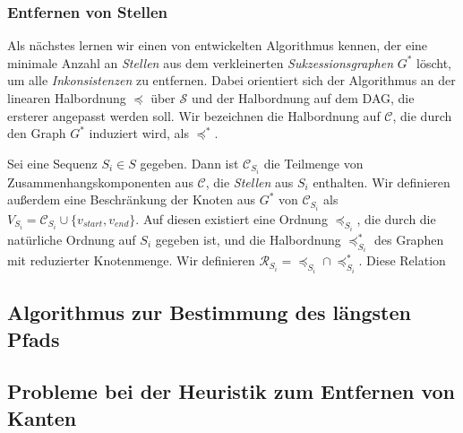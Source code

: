 \begin{center}
\end{center}

\subsubsection{Entfernen von Stellen}

Als nächstes lernen wir einen von \cite{pdc10} entwickelten Algorithmus kennen, der eine minimale Anzahl an \emph{Stellen} aus dem verkleinerten \emph{Sukzessionsgraphen} $G^*$ löscht, um alle \emph{Inkonsistenzen} zu entfernen. Dabei orientiert sich der Algorithmus an der linearen Halbordnung $\preceq$ über $\mathcal{S}$ und der Halbordnung auf dem DAG, die ersterer angepasst werden soll. Wir bezeichnen die Halbordnung auf $\mathcal{C}$, die durch den Graph $G^*$ induziert wird, als $\preceq^{*}$.

Sei eine Sequenz $S_i \in S$ gegeben. Dann ist $\mathcal{C}_{S_i}$ die Teilmenge von Zusammenhangskomponenten aus $\mathcal{C}$, die \emph{Stellen} aus $S_i$ enthalten. Wir definieren außerdem eine Beschränkung der Knoten aus $G^*$ von $\mathcal{C}_{S_i}$ als $V_{S_i} = \mathcal{C}_{S_i} \cup \{v_{start},v_{end}\}$. Auf diesen existiert eine Ordnung $\preceq_{S_i}$, die durch die natürliche Ordnung auf $S_i$ gegeben ist, und die Halbordnung $\preceq_{S_i}^{*}$ des Graphen mit reduzierter Knotenmenge. Wir definieren $\mathcal{R}_{S_i} = \preceq_{S_i} \cap \preceq_{S_i}^{*}$. Diese Relation 

\subsection{Algorithmus zur Bestimmung des längsten Pfads}

\subsection{Probleme bei der Heuristik zum Entfernen von Kanten}

